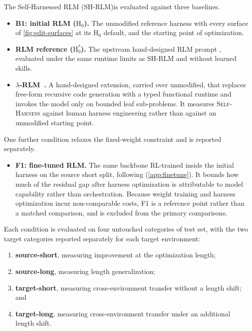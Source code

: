 \documentclass{article}
\newcommand{\rlm}{\textsc{RLM}\xspace}
\newcommand{\sh}{\textsc{Self-Harness}\xspace}
\newcommand{\hzero}{\ensuremath{\mathrm{H}_{0}}\xspace}
\newcommand{\hzerostar}{\ensuremath{\mathrm{H}_{0}^{*}}\xspace}
\begin{document}
The Self-Harnessed RLM (SH-RLM)is evaluated against three baselines.

\begin{itemize}
\item \textbf{B1: initial \rlm{} (\hzero{}).} The unmodified reference harness with every surface of \cref{fig:edit-surfaces} at its \hzero{} default, and the starting point of optimization.
\item \textbf{RLM reference (\hzerostar{}).} The upstream hand-designed RLM prompt \citep{zhang2025rlm}, evaluated under the same runtime limits as SH-RLM and without learned skills.
\item \textbf{$\lambda$-RLM~\citep{roy2026ycombinator}.} A hand-designed extension, carried over unmodified, that replaces free-form recursive code generation with a typed functional runtime and invokes the model only on bounded leaf sub-problems. It measures \sh{} against human harness engineering rather than against an unmodified starting point.
\end{itemize}


\noindent One further condition relaxes the fixed-weight constraint and is reported separately.

\begin{itemize}
\item \textbf{F1: fine-tuned \rlm{}.} The same backbone RL-trained inside the initial harness on the source short split, following \citet{zhang2026harness} (\cref{app:finetune}). It bounds how much of the residual gap after harness optimization is attributable to model capability rather than orchestration. Because weight training and harness optimization incur non-comparable costs, F1 is a reference point rather than a matched comparison, and is excluded from the primary comparisons.
\end{itemize}

Each condition is evaluated on four untouched categories of test set, with the two target categories reported separately for each target environment:
\begin{enumerate}
\item \textbf{source-short}, measuring improvement at the optimization length;
\item \textbf{source-long}, measuring length generalization;
\item \textbf{target-short}, measuring cross-environment transfer without a length shift; and
\item \textbf{target-long}, measuring cross-environment transfer under an additional length shift.
\end{enumerate}
\end{document}
